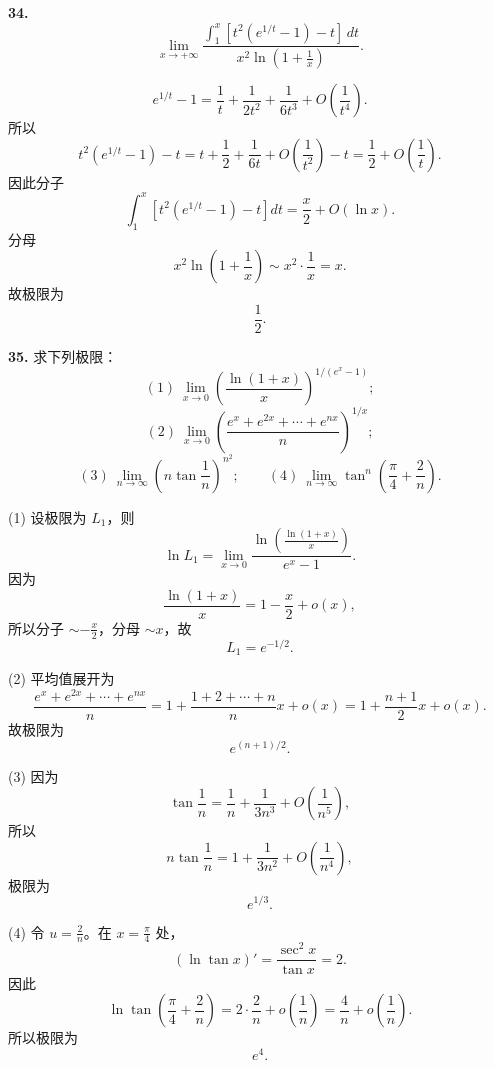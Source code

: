 \begin{problemblock}
\textbf{34.}
\[
\lim_{x\to+\infty}
\frac{\displaystyle\int_1^x\left[t^2\left(e^{1/t}-1\right)-t\right]\,dt}
{x^2\ln\left(1+\frac1x\right)}.
\]
\end{problemblock}

\begin{solutionblock}
\[
e^{1/t}-1=\frac1t+\frac1{2t^2}+\frac1{6t^3}+O\left(\frac1{t^4}\right).
\]
所以
\[
t^2(e^{1/t}-1)-t
=t+\frac12+\frac1{6t}+O\left(\frac1{t^2}\right)-t
=\frac12+O\left(\frac1t\right).
\]
因此分子
\[
\int_1^x\left[t^2(e^{1/t}-1)-t\right]dt
=\frac{x}{2}+O(\ln x).
\]
分母
\[
x^2\ln\left(1+\frac1x\right)\sim x^2\cdot\frac1x=x.
\]
故极限为
\[
\frac12.
\]
\end{solutionblock}

\begin{problemblock}
\textbf{35.} 求下列极限：
\[
(1)\ \lim_{x\to0}\left(\frac{\ln(1+x)}x\right)^{1/(e^x-1)};
\]
\[
(2)\ \lim_{x\to0}\left(\frac{e^x+e^{2x}+\cdots+e^{nx}}n\right)^{1/x};
\]
\[
(3)\ \lim_{n\to\infty}\left(n\tan\frac1n\right)^{n^2};
\qquad
(4)\ \lim_{n\to\infty}\tan^n\left(\frac\pi4+\frac2n\right).
\]
\end{problemblock}

\begin{solutionblock}
(1) 设极限为 \(L_1\)，则
\[
\ln L_1
=\lim_{x\to0}\frac{\ln\left(\frac{\ln(1+x)}x\right)}{e^x-1}.
\]
因为
\[
\frac{\ln(1+x)}x=1-\frac{x}{2}+o(x),
\]
所以分子 \(\sim-\frac{x}{2}\)，分母 \(\sim x\)，故
\[
L_1=e^{-1/2}.
\]

(2) 平均值展开为
\[
\frac{e^x+e^{2x}+\cdots+e^{nx}}n
=1+\frac{1+2+\cdots+n}{n}x+o(x)
=1+\frac{n+1}{2}x+o(x).
\]
故极限为
\[
e^{(n+1)/2}.
\]

(3) 因为
\[
\tan\frac1n=\frac1n+\frac1{3n^3}+O\left(\frac1{n^5}\right),
\]
所以
\[
n\tan\frac1n=1+\frac1{3n^2}+O\left(\frac1{n^4}\right),
\]
极限为
\[
e^{1/3}.
\]

(4) 令 \(u=\frac2n\)。在 \(x=\frac\pi4\) 处，
\[
\left(\ln\tan x\right)'=\frac{\sec^2x}{\tan x}=2.
\]
因此
\[
\ln\tan\left(\frac\pi4+\frac2n\right)
=2\cdot\frac2n+o\left(\frac1n\right)=\frac4n+o\left(\frac1n\right).
\]
所以极限为
\[
e^4.
\]

\end{solutionblock}

